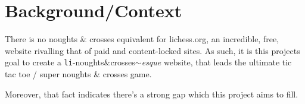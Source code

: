 \section{Background/Context}
There is no noughts \& crosses equivalent for lichess.org, an incredible, free, website
rivalling that of paid and content-locked sites.
As such, it is this projects goal to create a \verb|li|-noughts\&crosses$\sim$\textit{esque} website, that leads
the ultimate tic tac toe / super noughts \& crosses game.

Moreover, that fact indicates there's a strong gap which this project aims to fill.


